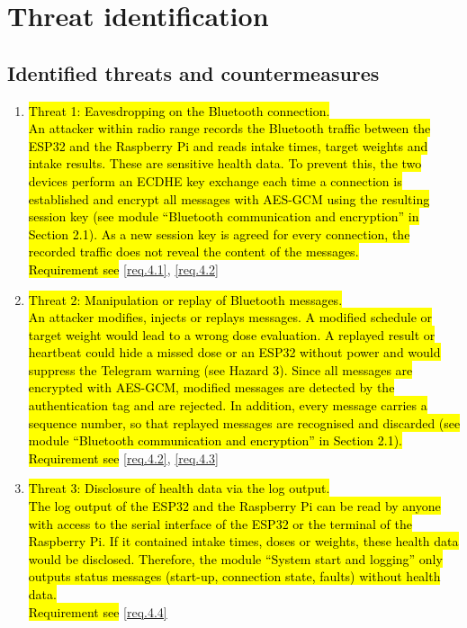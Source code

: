 \section{Threat identification}
\label{chapter5}

\subsection{Identified threats and countermeasures}
\begin{enumerate}
  \item \hl{Threat 1: Eavesdropping on the Bluetooth connection.}\\
  \hl{An attacker within radio range records the Bluetooth traffic between the ESP32
  and the Raspberry Pi and reads intake times, target weights and intake results.
  These are sensitive health data. To prevent this, the two devices perform an
  ECDHE key exchange each time a connection is established and encrypt all
  messages with AES-GCM using the resulting session key (see module
  ``Bluetooth communication and encryption'' in Section 2.1). As a new session
  key is agreed for every connection, the recorded traffic does not reveal
  the content of the messages.}\\
  \hl{Requirement see} \ref{req.4.1}, \ref{req.4.2}

  \item \hl{Threat 2: Manipulation or replay of Bluetooth messages.}\\
  \hl{An attacker modifies, injects or replays messages. A modified schedule or
  target weight would lead to a wrong dose evaluation. A replayed result or
  heartbeat could hide a missed dose or an ESP32 without power and would
  suppress the Telegram warning (see Hazard 3). Since all messages are
  encrypted with AES-GCM, modified messages are detected by the authentication
  tag and are rejected. In addition, every message carries a sequence number, so
  that replayed messages are recognised and discarded (see module
  ``Bluetooth communication and encryption'' in Section 2.1).}\\
  \hl{Requirement see} \ref{req.4.2}, \ref{req.4.3}

  \item \hl{Threat 3: Disclosure of health data via the log output.}\\
  \hl{The log output of the ESP32 and the Raspberry Pi can be read by anyone with
  access to the serial interface of the ESP32 or the terminal of the Raspberry Pi. If it contained intake times,
  doses or weights, these health data would be disclosed. Therefore, the module
  ``System start and logging'' only outputs status messages (start-up,
  connection state, faults) without health data.}\\
  \hl{Requirement see} \ref{req.4.4}


\end{enumerate}
